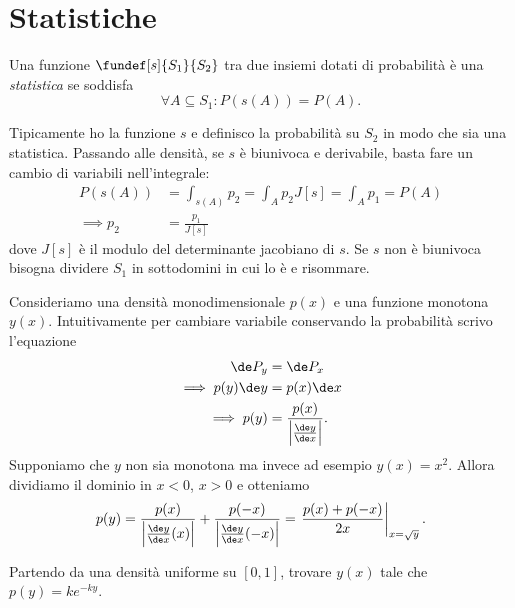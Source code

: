 \section{Statistiche}

\begin{definition}[Statistica]
	Una funzione $\fundef[s]{S_1}{S_2}$ tra due insiemi dotati di probabilità è una \emph{statistica} se soddisfa
	\begin{equation*}
		\forall A\subseteq S_1 : P(s(A)) = P(A).
	\end{equation*}
\end{definition}

Tipicamente ho la funzione $s$ e definisco la probabilità su $S_2$ in modo che sia una statistica.
Passando alle densità, se $s$ è biunivoca e derivabile, basta fare un cambio di variabili nell'integrale:
\begin{align*}
	P(s(A)) &= \int_{s(A)} p_2 = \int_A p_2 J[s] = \int_A p_1 = P(A) \\
	\implies p_2 &= \frac{p_1}{J[s]}
\end{align*}
dove $J[s]$ è il modulo del determinante jacobiano di $s$.
Se $s$ non è biunivoca bisogna dividere $S_1$ in sottodomini in cui lo è e risommare.

\begin{example}
	\label{th:stat1d}
	Consideriamo una densità monodimensionale $p(x)$ e una funzione monotona $y(x)$.
	Intuitivamente per cambiare variabile conservando la probabilità scrivo l'equazione
	\begin{align*}
		\de P_y &= \de P_x \\
		\implies p(y)\de y &= p(x) \de x \\
		\implies p(y) &= \frac{p(x)}{\left|\frac{\de y}{\de x}\right|}.
	\end{align*}
	Supponiamo che $y$ non sia monotona ma invece ad esempio $y(x)=x^2$.
	Allora dividiamo il dominio in $x<0$, $x>0$ e otteniamo
	\begin{equation*}
		p(y) = \frac{p(x)}{\left|\frac{\de y}{\de x}(x)\right|} + \frac{p(-x)}{\left|\frac{\de y}{\de x}(-x)\right|} =
		\left.\frac{p(x)+p(-x)}{2x}\right|_{x=\sqrt y}.
	\end{equation*}
\end{example}

\begin{exercise}
	Partendo da una densità uniforme su $[0,1]$,
	trovare $y(x)$ tale che $p(y) = ke^{-ky}$.
\end{exercise}

